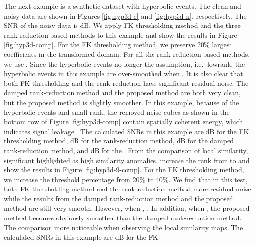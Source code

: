 The next example is a synthetic dataset with hyperbolic events.  The clean and noisy data are shown in Figures \ref{fig:hyp3d-c} and \ref{fig:hyp3d-n}, respectively. The SNR of the noisy data is  dB. We apply FK thresholding method and the three rank-reduction based methods to this example and show the results in Figure \ref{fig:hyp3d-comp}. For the FK thresholding method, we preserve 20\% largest coefficients in the transformed domain. For all the rank-reduction based methods, we use . Since the hyperbolic events no longer  the assumption, i.e.,  lowrank, the hyperbolic events in this example are over-smoothed when . It is also clear that both FK thresholding and the rank-reduction  have significant residual noise. The damped rank-reduction method and the proposed method are both very clean, but the proposed method is slightly smoother. In this example, because of the hyperbolic events and  small rank, the removed noise cubes as shown in the bottom row of Figure \ref{fig:hyp3d-comp} contain  spatially coherent energy, which indicates signal leakage \cite[]{yangkang2015ortho}.  The calculated SNRs in this example are  dB for the FK thresholding method,  dB for the rank-reduction method,  dB for the damped rank-reduction method, and  dB for the .  From the comparison of local similarity, significant  highlighted as high similarity anomalies.  increase the rank from  to  and show the results in Figure \ref{fig:hyp3d-9-comp}. For the FK thresholding method, we increase the threshold percentage from 20\% to 40\%. We find that in this test, both FK thresholding method and the rank-reduction method  more residual noise while the results from the damped rank-reduction method and the proposed method are still very smooth.  However, when ,  . In addition, when , the proposed method becomes obviously smoother than the damped rank-reduction method. The comparison  more noticeable when observing the local similarity maps. The calculated SNRs in this example are  dB for the FK 